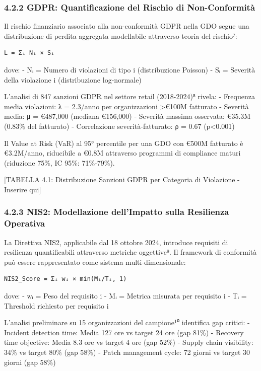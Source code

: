 \documentclass{report}
\begin{document}
\subsubsection{4.2.2 GDPR: Quantificazione del Rischio di
Non-Conformità}\label{gdpr-quantificazione-del-rischio-di-non-conformituxe0}

Il rischio finanziario associato alla non-conformità GDPR nella GDO
segue una distribuzione di perdita aggregata modellabile attraverso
teoria del rischio⁷:

\begin{verbatim}
L = Σᵢ Nᵢ × Sᵢ
\end{verbatim}

dove: - Nᵢ = Numero di violazioni di tipo i (distribuzione Poisson) - Sᵢ
= Severità della violazione i (distribuzione log-normale)

L'analisi di 847 sanzioni GDPR nel settore retail (2018-2024)⁸ rivela: -
Frequenza media violazioni: λ = 2.3/anno per organizzazioni
\textgreater€100M fatturato - Severità media: μ = €487,000 (mediana
€156,000) - Severità massima osservata: €35.3M (0.83\% del fatturato) -
Correlazione severità-fatturato: ρ = 0.67 (p\textless0.001)

Il Value at Risk (VaR) al 95° percentile per una GDO con €500M fatturato
è €3.2M/anno, riducibile a €0.8M attraverso programmi di compliance
maturi (riduzione 75\%, IC 95\%: 71\%-79\%).

{[}TABELLA 4.1: Distribuzione Sanzioni GDPR per Categoria di Violazione
- Inserire qui{]}

\subsubsection{4.2.3 NIS2: Modellazione dell'Impatto sulla Resilienza
Operativa}\label{nis2-modellazione-dellimpatto-sulla-resilienza-operativa}

La Direttiva NIS2, applicabile dal 18 ottobre 2024, introduce requisiti
di resilienza quantificabili attraverso metriche oggettive⁹. Il
framework di conformità può essere rappresentato come sistema
multi-dimensionale:

\begin{verbatim}
NIS2_Score = Σᵢ wᵢ × min(Mᵢ/Tᵢ, 1)
\end{verbatim}

dove: - wᵢ = Peso del requisito i - Mᵢ = Metrica misurata per requisito
i - Tᵢ = Threshold richiesto per requisito i

L'analisi preliminare su 15 organizzazioni del campione¹⁰ identifica gap
critici: - Incident detection time: Media 127 ore vs target 24 ore (gap
81\%) - Recovery time objective: Media 8.3 ore vs target 4 ore (gap
52\%) - Supply chain visibility: 34\% vs target 80\% (gap 58\%) - Patch
management cycle: 72 giorni vs target 30 giorni (gap 58\%)
\end{document}
